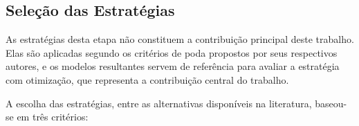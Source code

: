 \subsection{Seleção das Estratégias}\label{subsec:metodologia_selecao_estrategias}


As estratégias desta etapa não constituem a contribuição principal deste trabalho. Elas são
aplicadas segundo os critérios de poda propostos por seus respectivos autores, e os modelos
resultantes servem de referência para avaliar a estratégia com otimização,
que representa a contribuição central do trabalho.

A escolha das estratégias, entre as alternativas disponíveis na literatura, baseou-se em
três critérios:

